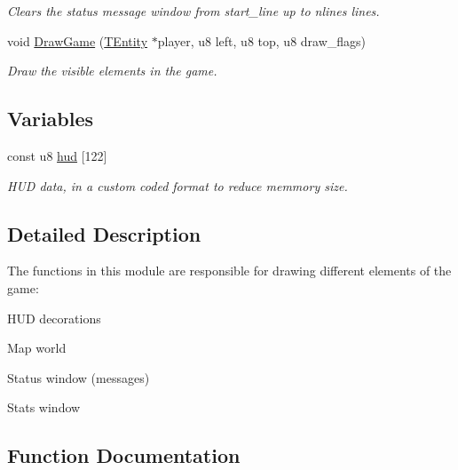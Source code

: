 \begin{DoxyCompactItemize}
\begin{DoxyCompactList}\small\item\em Clears the status message window from {\itshape start\+\_\+line} up to {\itshape nlines} lines. \end{DoxyCompactList}\item 
void \mbox{\hyperlink{group__user__interface_gaf665342055aea2d01fc6375b38c8b4df}{Draw\+Game}} (\mbox{\hyperlink{structTEntity}{T\+Entity}} $\ast$player, u8 left, u8 top, u8 draw\+\_\+flags)
\begin{DoxyCompactList}\small\item\em Draw the visible elements in the game. \end{DoxyCompactList}\end{DoxyCompactItemize}
\subsection*{Variables}
\begin{DoxyCompactItemize}
\item 
const u8 \mbox{\hyperlink{group__user__interface_gaec0e6bac325752e9bc0a41d772670bd9}{hud}} \mbox{[}122\mbox{]}
\begin{DoxyCompactList}\small\item\em H\+UD data, in a custom coded format to reduce memmory size. \end{DoxyCompactList}\end{DoxyCompactItemize}


\subsection{Detailed Description}
The functions in this module are responsible for drawing different elements of the game\+:


\begin{DoxyItemize}
\item H\+UD decorations
\item Map world
\item Status window (messages)
\item Stats window 
\end{DoxyItemize}

\subsection{Function Documentation}
\mbox{\label{group__user__interface_gaf665342055aea2d01fc6375b38c8b4df}} 
